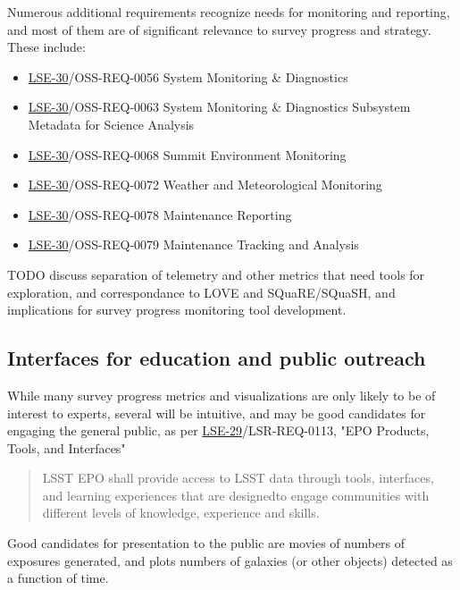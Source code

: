 Numerous additional requirements recognize needs for monitoring and reporting, and most of them are of significant relevance to survey progress and strategy. These include:
\begin{itemize}
\item \href{https://ls.st/lse-30}{LSE-30}/OSS-REQ-0056 System Monitoring \& Diagnostics
\item \href{https://ls.st/lse-30}{LSE-30}/OSS-REQ-0063 System Monitoring \& Diagnostics Subsystem Metadata for Science Analysis
\item \href{https://ls.st/lse-30}{LSE-30}/OSS-REQ-0068 Summit Environment Monitoring
\item \href{https://ls.st/lse-30}{LSE-30}/OSS-REQ-0072 Weather and Meteorological Monitoring
\item \href{https://ls.st/lse-30}{LSE-30}/OSS-REQ-0078 Maintenance Reporting
\item \href{https://ls.st/lse-30}{LSE-30}/OSS-REQ-0079 Maintenance Tracking and Analysis
\end{itemize}

TODO discuss separation of telemetry and other metrics that need tools for exploration, and correspondance to LOVE and SQuaRE/SQuaSH, and implications for survey progress monitoring tool development.

\subsection{Interfaces for education and public outreach}
\label{sec:orge91762f}
While many survey progress metrics and visualizations are only likely to be of interest to experts, several will be intuitive, and may be good candidates for engaging the general public, as per \href{https://ls.st/lse-29}{LSE-29}/LSR-REQ-0113, "EPO Products, Tools, and Interfaces"
\begin{quote}
LSST EPO shall provide access to LSST data through tools, interfaces,
and learning experiences that are designedto engage communities with
different levels of knowledge, experience and skills.
\end{quote}
Good candidates for presentation to the public are movies of numbers of exposures generated, and plots numbers of galaxies (or other objects) detected as a function of time.

